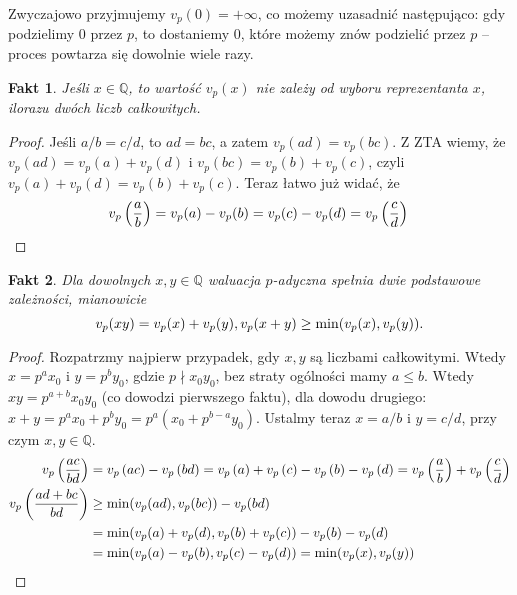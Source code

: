 \documentclass[a4paper,fleqn,9pt]{extarticle}
\newtheorem{fkt}{Fakt}
\begin{document}
Zwyczajowo przyjmujemy $v_p(0) = +\infty$, co możemy uzasadnić następująco: gdy podzielimy $0$ przez $p$, to dostaniemy $0$, które możemy znów podzielić przez $p$ -- proces powtarza się dowolnie wiele razy.

\begin{fkt}Jeśli $x\in\mathbb Q$, to wartość $v_p(x)$ nie zależy od wyboru reprezentanta $x$, ilorazu dwóch liczb całkowitych.\end{fkt}

\begin{proof}Jeśli $a/b = c/d$, to $ad = bc$, a zatem $v_p(ad) = v_p(bc)$. Z ZTA wiemy, że $v_p(ad) = v_p(a) + v_p(d)$ i $v_p(bc)= v_p(b) + v_p(c)$, czyli $v_p(a) + v_p(d) = v_p(b) + v_p(c)$. Teraz łatwo już widać, że \begin{equation*}v_p\left(\frac{a}{b}\right) = v_p(a)-v_p(b) = v_p(c) - v_p(d) = v_p\left(\frac{c}{d}\right)\qedhere\end{equation*}\end{proof}


\begin{fkt}
Dla dowolnych $x,y \in \mathbb Q$ waluacja $p$-adyczna spełnia dwie podstawowe zależności, mianowicie
\begin{equation*}v_p(xy) = v_p(x) + v_p(y), \\ v_p(x+y) \ge \min(v_p(x), v_p(y)).\end{equation*}

\end{fkt}
\begin{proof}Rozpatrzmy najpierw przypadek, gdy $x,y$ są liczbami całkowitymi. Wtedy $x = p^ax_0$ i $y=p^by_0$, gdzie $p\nmid x_0y_0$, bez straty ogólności mamy $a\le b$. Wtedy $xy=p^{a+b}x_0y_0$ (co dowodzi pierwszego faktu), dla dowodu drugiego: $x+y=p^ax_0+p^by_0 = p^a\left(x_0+p^{b-a}y_0\right)$. Ustalmy teraz $x=a/b$ i $y=c/d$, przy czym $x,y\in\mathbb Q$.
\begin{align*}
v_p\left(\frac{ac}{bd}\right) & = v_p\left(ac\right) - v_p\left(bd\right) = v_p\left(a\right) +v_p\left(c\right) - v_p\left(b\right) - v_p\left(d\right) = v_p\left(\frac{a}{b}\right) +v_p\left(\frac{c}{d}\right) \\
v_p\left(\frac{ad+bc}{bd}\right) & \ge \min(v_p(ad), v_p(bc)) - v_p(bd) \\ & = \min(v_p(a) + v_p(d), v_p(b) + v_p(c)) - v_p(b) -v_p(d) \notag\\
& = \min(v_p(a) - v_p(b), v_p(c) - v_p(d)) = \min(v_p(x), v_p(y)) \qedhere
\end{align*}
\end{proof}
\end{document}
